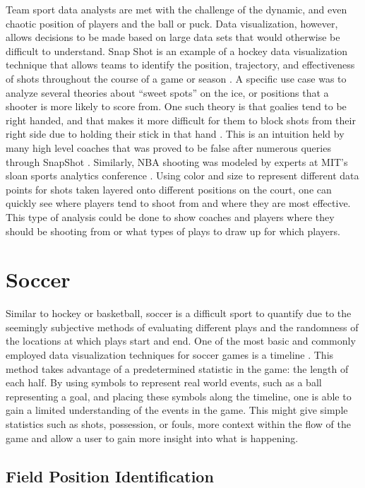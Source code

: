 \documentclass[sigconf]{acmart}
\begin{document}
Team sport data analysts are met with the challenge of the dynamic, and even chaotic position of players and the ball or puck. Data visualization, however, allows decisions to be made based on large data sets that would otherwise be difficult to understand. Snap Shot is an example of a hockey data visualization technique that allows teams to identify the position, trajectory, and effectiveness of shots throughout the course of a game or season \cite{SnapShot}. A specific use case was to analyze several theories about “sweet spots” on the ice, or positions that a shooter is more likely to score from. One such theory is that goalies tend to be right handed, and that makes it more difficult for them to block shots from their right side due to holding their stick in that hand \cite{SnapShot}. This is an intuition held by many high level coaches that was proved to be false after numerous queries through SnapShot \cite{SnapShot}. Similarly, NBA shooting was modeled by experts at MIT’s sloan sports analytics conference \cite{Sloan}. Using color and size to represent different data points for shots taken layered onto different positions on the court, one can quickly see where players tend to shoot from and where they are most effective. This type of analysis could be done to show coaches and players where they should be shooting from or what types of plays to draw up for which players.

\section{Soccer}

Similar to hockey or basketball, soccer is a difficult sport to quantify due to the seemingly subjective methods of evaluating different plays and the randomness of the locations at which plays start and end. One of the most basic and commonly employed data visualization techniques for soccer games is a timeline \cite{SoccerStories}. This method takes advantage of a predetermined statistic in the game: the length of each half. By using symbols to represent real world events, such as a ball representing a goal, and placing these symbols along the timeline, one is able to gain a limited understanding of the events in the game. This might give simple statistics such as shots, possession, or fouls, more context within the flow of the game and allow a user to gain more insight into what is happening. 

\subsection{Field Position Identification}
\end{document}
